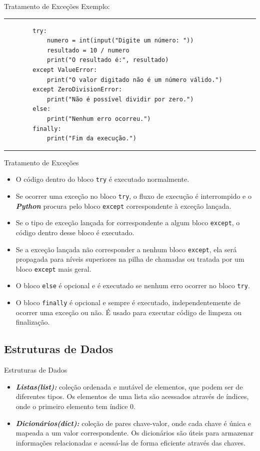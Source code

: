 \documentclass{beamer}
\begin{document}
\begin{frame}[fragile]{Tratamento de Exceções}
	\label{tratamento_de_excecoes_exemplo}
	Exemplo:
	\rule{\textwidth}{1pt}
	\scriptsize
	\begin{verbatim}
		try:
			numero = int(input("Digite um número: "))
			resultado = 10 / numero
			print("O resultado é:", resultado)
		except ValueError:
			print("O valor digitado não é um número válido.")
		except ZeroDivisionError:
			print("Não é possível dividir por zero.")
		else:
			print("Nenhum erro ocorreu.")
		finally:
			print("Fim da execução.")		
	\end{verbatim}
	\rule{\textwidth}{1pt}
\end{frame}

\begin{frame}[fragile]{Tratamento de Exceções}
	\label{tratamento_de_excecoes_explicacao_exemplo}
\begin{itemize}
	\item O código dentro do bloco \texttt{try} é executado normalmente.
	\item Se ocorrer uma exceção no bloco \texttt{try}, o fluxo de execução é interrompido e o \textbf{\textit{Python}} procura pelo bloco \texttt{except} correspondente à exceção lançada.
	\item Se o tipo de exceção lançada for correspondente a algum bloco \texttt{except}, o código dentro desse bloco é executado.
	\item Se a exceção lançada não corresponder a nenhum bloco \texttt{except}, ela será propagada para níveis superiores na pilha de chamadas ou tratada por um bloco \texttt{except} mais geral.
	\item O bloco \texttt{else} é opcional e é executado se nenhum erro ocorrer no bloco \texttt{try}.
	\item O bloco \texttt{finally} é opcional e sempre é executado, independentemente de ocorrer uma exceção ou não. É usado para executar código de limpeza ou finalização.
\end{itemize}
\end{frame}


\subsection{Estruturas de Dados}

\begin{frame}[fragile]{Estruturas de Dados}
	\label{estruturas_de_dados}
	\begin{itemize}
		\item \textbf{\textit{Listas(list):}} coleção ordenada e mutável de elementos, que podem ser de diferentes tipos. Os elementos de uma lista são acessados através de índices, onde o primeiro elemento tem índice 0.
		\item \textbf{\textit{Dicionários(dict):}} coleção de pares chave-valor, onde cada chave é única e mapeada a um valor correspondente. Os dicionários são úteis para armazenar informações relacionadas e acessá-las de forma eficiente através das chaves.
	\end{itemize}
\end{frame}
\end{document}
